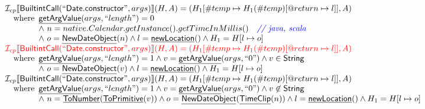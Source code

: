 \documentclass{article}
\newcommand{\SF}[1]{\mbox{\textsf{#1}}}
\newcommand{\comment}[1]{\textit{#1}}
\newcommand{\wherec}[1]{{\rm where}\begin{array}[t]{l}#1\end{array}}
\newcommand{\I}{\mathcal{I}}
\newcommand{\lbr}{\llbracket}
\newcommand{\rbr}{\rrbracket}
\newcommand{\hf}[1]{\underline{\sf #1}}
\def\inred{\color{red}}
\def\inblue{\color{blue}}
\def\inred{\color{red}}
\def\inblue{\color{blue}}
\begin{document}
\[
\begin{array}{l}
\I _{cp}\lbr \SF{BuiltintCall}(``\SF{Date.constructor}",args)\rbr(H,A)
  = (H_1[\#temp \mapsto H_1(\#temp)[@return \mapsto l]], A)\\
\quad\wherec{
  \hf{getArgValue}(args, ``length") = 0\\
  \land\ n = native.Calendar.getInstance().getTimeInMillis() \quad\comment{{\inblue // java, scala}}\\
  \land\ o = \hf{NewDateObject}(n) \land l = \hf{newLocation}() \land H_1 = H[l \mapsto o]
  }\\
  
\inred \I _{cp}\lbr \SF{BuiltintCall}(``\SF{Date.constructor}",args)\rbr(H,A)
  = (H_1[\#temp \mapsto H_1(\#temp)[@return \mapsto l]], A)\\
\quad\wherec{
  \hf{getArgValue}(args, ``length") = 1 \land v = \hf{getArgValue}(args, ``0") \land v \in \SF{String}\\
  \land\ o = \hf{NewDateObject}(v) \land l = \hf{newLocation}() \land H_1 = H[l \mapsto o]
  }\\ 
  
\I _{cp}\lbr \SF{BuiltintCall}(``\SF{Date.constructor}",args)\rbr(H,A)
  = (H_1[\#temp \mapsto H_1(\#temp)[@return \mapsto l]], A)\\
\quad\wherec{
  \hf{getArgValue}(args, ``length") = 1 \land v = \hf{getArgValue}(args, ``0") \land v \not\in \SF{String}\\
  \land\ n = \hf{ToNumber}(\hf{ToPrimitive}(v))
  \land o = \hf{NewDateObject}(\hf{TimeClip}(n)) \land l = \hf{newLocation}() \land H_1 = H[l \mapsto o]
  }\\
  

\end{array}\]
\end{document}
